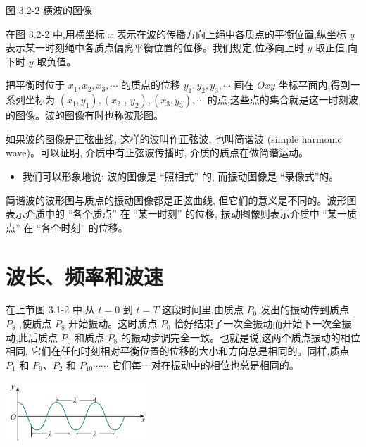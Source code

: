 \documentclass[10pt]{article}
\begin{document}
图 3.2-2 横波的图像

在图 3.2-2 中,用横坐标 \(x\) 表示在波的传播方向上绳中各质点的平衡位置,纵坐标 \(y\) 表示某一时刻绳中各质点偏离平衡位置的位移。我们规定,位移向上时 \(y\) 取正值,向下时 \(y\) 取负值。

把平衡时位于 \({x}_{1},{x}_{2},{x}_{3},\cdots\) 的质点的位移 \({y}_{1},{y}_{2},{y}_{3},\cdots\) 画在 \({Oxy}\) 坐标平面内,得到一系列坐标为 \(\left( {{x}_{1},{y}_{1}}\right) ,\left( {x}_{2}\right.\) , \(\left. {y}_{2}\right) ,\left( {{x}_{3},{y}_{3}}\right) ,\cdots\) 的点,这些点的集合就是这一时刻波的图像。波的图像有时也称波形图。

如果波的图像是正弦曲线, 这样的波叫作正弦波, 也叫简谐波 (simple harmonic wave)。可以证明, 介质中有正弦波传播时, 介质的质点在做简谐运动。

\begin{mdframed}

\begin{itemize}
\item 我们可以形象地说: 波的图像是 “照相式” 的, 而振动图像是 “录像式”的。
\end{itemize}

\end{mdframed}

简谐波的波形图与质点的振动图像都是正弦曲线, 但它们的意义是不同的。波形图表示介质中的 “各个质点” 在 “某一时刻” 的位移, 振动图像则表示介质中 “某一质点” 在 “各个时刻” 的位移。

\section*{波长、频率和波速}

在上节图 3.1-2 中,从 \(t = 0\) 到 \(t = T\) 这段时间里,由质点 \({P}_{0}\) 发出的振动传到质点 \({P}_{8}\) ,使质点 \({P}_{8}\) 开始振动。这时质点 \({P}_{0}\) 恰好结束了一次全振动而开始下一次全振动,此后质点 \({P}_{0}\) 和质点 \({P}_{8}\) 的振动步调完全一致。也就是说,这两个质点振动的相位相同, 它们在任何时刻相对平衡位置的位移的大小和方向总是相同的。同样,质点 \({P}_{1}\) 和 \({P}_{9}\text{、}{P}_{2}\) 和 \({P}_{10}\cdots \cdots\) 它们每一对在振动中的相位也总是相同的。

\begin{center}
\includegraphics[max width=0.4\textwidth]{images/01910e4c-ebb8-7d2c-8f2f-2375bc1d2d12_73_124538.jpg}
\end{center}
\end{document}
